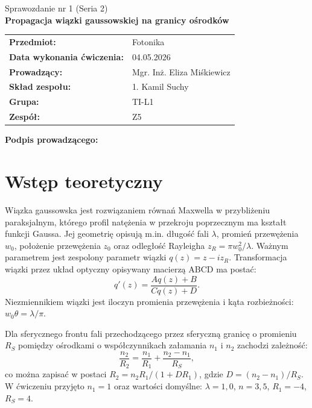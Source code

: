 \documentclass[a4paper,12pt]{article}
\title{}
\date{}
\begin{document}
\begin{titlepage}
\centering
{\Large Sprawozdanie nr 1 (Seria 2)\\[6pt]}
{\LARGE \textbf{Propagacja wiązki gaussowskiej na granicy ośrodków}\\[18pt]}

\begin{tabular}{@{}ll@{}}
\textbf{Przedmiot:} & Fotonika \\
\textbf{Data wykonania ćwiczenia:} & 04.05.2026 \\
\textbf{Prowadzący:} & Mgr. Inż. Eliza Miśkiewicz \\
\textbf{Skład zespołu:} & 1. Kamil Suchy \\
\textbf{Grupa:} & TI-L1 \\
\textbf{Zespół:} & Z5 \\
\end{tabular}

\vfill
\noindent\textbf{Podpis prowadzącego:} \hrulefill
\end{titlepage}

\section{Wstęp teoretyczny}
Wiązka gaussowska jest rozwiązaniem równań Maxwella w przybliżeniu paraksjalnym,
którego profil natężenia w przekroju poprzecznym ma kształt funkcji Gaussa.
Jej geometrię opisują m.in. długość fali $\lambda$, promień przewężenia $w_0$,
położenie przewężenia $z_0$ oraz odległość Rayleigha $z_R = \pi w_0^2/\lambda$.
Ważnym parametrem jest zespolony parametr wiązki $q(z) = z - i z_R$.
Transformacja wiązki przez układ optyczny opisywany macierzą ABCD ma postać:
\begin{equation}
q'(z) = \frac{Aq(z) + B}{Cq(z) + D}.
\end{equation}
Niezmiennikiem wiązki jest iloczyn promienia przewężenia i kąta rozbieżności:
$w_0\theta = \lambda/\pi$.

Dla sferycznego frontu fali przechodzącego przez sferyczną granicę o promieniu
$R_S$ pomiędzy ośrodkami o współczynnikach załamania $n_1$ i $n_2$ zachodzi zależność:
\begin{equation}
\frac{n_2}{R_2} = \frac{n_1}{R_1} + \frac{n_2 - n_1}{R_S},
\end{equation}
co można zapisać w postaci $R_2 = n_2 R_1 / (1 + D R_1)$, gdzie
$D = (n_2 - n_1)/R_S$. W ćwiczeniu przyjęto $n_1 = 1$ oraz wartości domyślne:
$\lambda = 1{,}0$, $n = 3{,}5$, $R_1 = -4$, $R_S = 4$.
\end{document}
